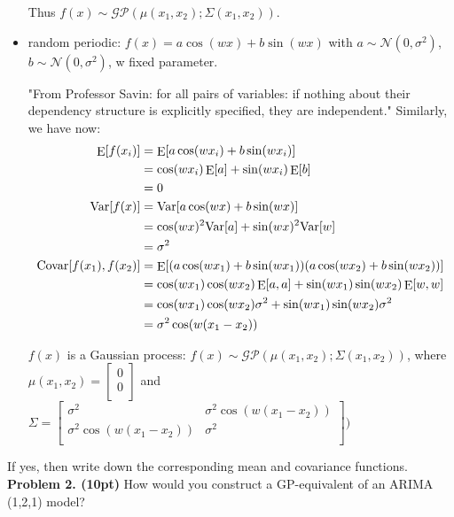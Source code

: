 \documentclass[12pt]{article}
\DeclareMathOperator*{\E}{\rm E}
\newcommand{\Var}{\mathrm{Var}}
\newcommand{\Covar}{\mathrm{Covar}}
\begin{document}
\begin{itemize}
Thus $ f(x) \sim  \mathcal{GP}(\mu(x_1, x_2); \Sigma(x_1,x_2))$.

\item random periodic: $f(x) = a \cos(wx)+ b \sin(wx)$ with $a \sim \mathcal{N}(0,\sigma^2)$, $b \sim \mathcal{N}(0,\sigma^2)$, w fixed parameter.

"From Professor Savin: for all pairs of variables: if nothing about their dependency structure is explicitly specified, they are independent."
Similarly, we have now:
\begin{align*}
	\E[f(x_i)]			&=	\E[a \cos(w x_i) + b \sin(w x_i)] \\
					&= 	\cos(w x_i) \E[a] + \sin(w x_i) \E[b] \\
					&=	0 \\
	\Var[f(x)]			&=	\Var[a \cos(wx)+ b \sin(wx)] \\
					&= 	\cos(wx)^2 \Var[a] + \sin(wx)^2 \Var[w] \\
					&=	\sigma^2  \\					
	\Covar[f(x_1),f(x_2)]	&=	\E[ (a \cos(w x_1) + b  \sin(w x_1)) (a \cos(w x_2) + b  \sin(w x_2))] \\
					&=	\cos(w x_1) \cos(w x_2) \E[a,a] + \sin(w x_1) \sin(w x_2) \E[w,w]  \\
					&=	\cos(w x_1) \cos(w x_2)  \sigma^2 +  \sin(w x_1) \sin(w x_2) \sigma^2  \\
					&= 	\sigma^2 \cos(w (x_1 - x_2))		
\end{align*}

$f(x)$ is a Gaussian process: $ f(x) \sim  \mathcal{GP}(\mu(x_1, x_2); \Sigma(x_1,x_2))$, where $ \mu(x_1, x_2) = \begin{bmatrix}
		0 \\
		0 \\
	\end{bmatrix}$ and $\Sigma =  \begin{bmatrix}
		\sigma^2	& \sigma^2 \cos(w (x_1 - x_2))	 \\
		\sigma^2 \cos(w (x_1 - x_2))	&  \sigma^2 \\
	\end{bmatrix}
	\Big) $

\end{itemize}
If yes, then write down the corresponding mean and covariance functions.\\


\noindent \textbf{Problem 2. (10pt)} 
How would you construct a GP-equivalent of an ARIMA (1,2,1) model?\\
\end{document}
